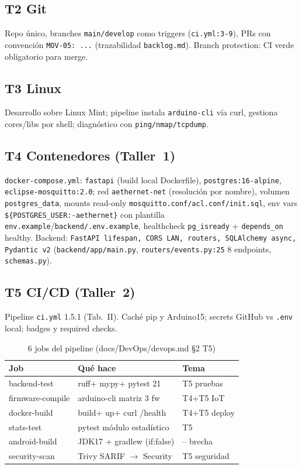 \documentclass[conference]{IEEEtran}
\begin{document}
\subsection{T2 Git}
Repo único, branches \texttt{main/develop} como triggers (\texttt{ci.yml:3-9}), PRs con convención \texttt{MOV-05: ...} (trazabilidad \texttt{backlog.md}). Branch protection: CI verde obligatorio para merge.

\subsection{T3 Linux}
Desarrollo sobre Linux Mint; pipeline instala \texttt{arduino-cli} vía curl, gestiona cores/libs por shell; diagnóstico con \texttt{ping/nmap/tcpdump}.

\subsection{T4 Contenedores (Taller~1)}
\texttt{docker-compose.yml}: \texttt{fastapi} (build local Dockerfile), \texttt{postgres:16-alpine}, \texttt{eclipse-mosquitto:2.0}; red \texttt{aethernet-net} (resolución por nombre), volumen \texttt{postgres\_data}, mounts read-only \texttt{mosquitto.conf/acl.conf/init.sql}, env vars \texttt{\$\{POSTGRES\_USER:-aethernet\}} con plantilla \texttt{env.example}/\texttt{backend/.env.example}, healthcheck \texttt{pg\_isready} + \texttt{depends\_on} healthy. Backend: \texttt{FastAPI lifespan, CORS LAN, routers, SQLAlchemy async, Pydantic v2} (\texttt{backend/app/main.py}, \texttt{routers/events.py:25} 8 endpoints, \texttt{schemas.py}).

\subsection{T5 CI/CD (Taller~2)}
Pipeline \texttt{ci.yml} 1.5.1 (Tab.~II). Caché pip y Arduino15; secrets GitHub vs \texttt{.env} local; badges y required checks.

\begin{table}[t]
\centering
\caption{6 jobs del pipeline (docs/DevOps/devops.md \S2 T5)}
\label{tab:ci}
\begin{tabular}{@{}lll@{}}
\toprule
Job & Qué hace & Tema \\
\midrule
backend-test & ruff+ mypy+ pytest 21 & T5 pruebas \\
firmware-compile & arduino-cli matriz 3 fw & T4+T5 IoT \\
docker-build & build+ up+ curl /health & T4+T5 deploy \\
stats-test & pytest módulo estadístico & T5 \\
android-build & JDK17 + gradlew (if:false) & -- brecha \\
security-scan & Trivy SARIF $\rightarrow$ Security & T5 seguridad \\
\bottomrule
\end{tabular}
\end{table}
\end{document}

